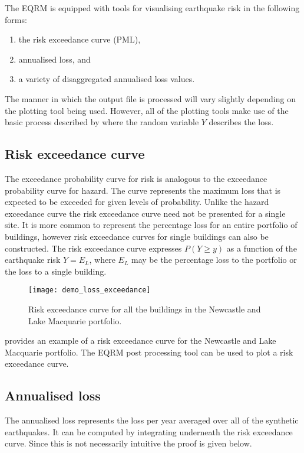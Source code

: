 The EQRM is equipped with tools for visualising earthquake risk in
the following forms:
\begin{enumerate}
\item the risk exceedance curve (PML), \item annualised loss, and
\item a variety of disaggregated annualised loss values.
\end{enumerate}
The manner in which the output file is processed will vary slightly
depending on the plotting tool being used.  However, all of the
plotting tools make use of the basic process described by
 where the random variable
$Y$ describes the loss.

\subsection{Risk exceedance curve}

The exceedance probability curve for risk is analogous to the
exceedance probability curve for hazard. The curve represents the
maximum loss that is expected to be exceeded for given levels of
probability. Unlike the hazard exceedance curve the risk
exceedance curve need not be presented for a single site. It is
more common to represent the percentage loss for an entire
portfolio of buildings, however risk exceedance curves for single
buildings can also be constructed. The risk exceedance curve
expresses $P(Y \ge y)$ as a function of the earthquake risk
$Y=E_L$, where $E_L$ may be the percentage loss to the portfolio
or the loss to a single building.
\begin{figure}
\texttt{[image: demo\_loss\_exceedance]}
\caption{Risk exceedance curve for all the buildings in the
Newcastle and Lake Macquarie portfolio.} \label{fig-risk-pml}
\end{figure}
 provides an example of a risk exceedance curve
for the Newcastle and Lake Macquarie portfolio.  The
EQRM post processing tool
 can be used
 to plot a
risk exceedance curve.

\subsection{Annualised loss}

The annualised loss represents the loss per year averaged over all
of the synthetic earthquakes. It can be computed by integrating
underneath the risk exceedance curve. Since this is not
necessarily intuitive the proof is given below.

